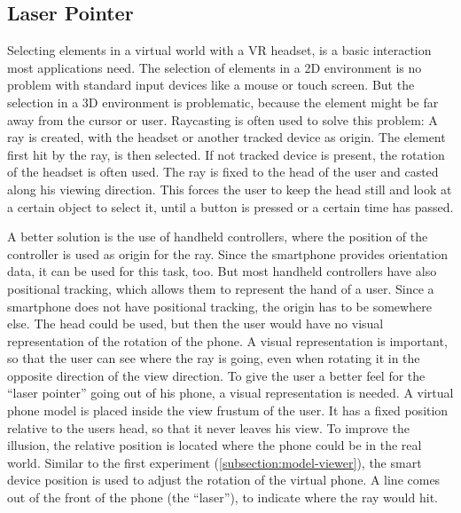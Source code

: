 \subsection{Laser Pointer}\label{subsection:laser-pointer}

Selecting elements in a virtual world with a \ac{VR} headset, is a basic interaction most applications need. The selection of elements in a \ac{2D} environment is no problem with standard input devices like a mouse or touch screen. But the selection in a \ac{3D} environment is problematic, because the element might be far away from the cursor or user. Raycasting is often used to solve this problem: A ray is created, with the headset or another tracked device as origin. The element first hit by the ray, is then selected. If not tracked device is present, the rotation of the headset is often used. The ray is fixed to the head of the user and casted along his viewing direction. %
This forces the user to keep the head still and look at a certain object to select it, until a button is pressed or a certain time has passed.


A better solution is the use of handheld controllers, where the position of the controller is used as origin for the ray. Since the smartphone provides orientation data, it can be used for this task, too. But most handheld controllers have also positional tracking, which allows them to represent the hand of a user. Since a smartphone does not have positional tracking, the origin has to be somewhere else. The head could be used, but then the user would have no visual representation of the rotation of the phone. A visual representation is important, so that the user can see where the ray is going, even when rotating it in the opposite direction of the view direction. To give the user a better feel for the \enquote{laser pointer} going out of his phone, a visual representation is needed. A virtual phone model is placed inside the view frustum of the user. It has a fixed position relative to the users head, so that it never leaves his view. To improve the illusion, the relative position is located where the phone could be in the real world. Similar to the first experiment (\ref{subsection:model-viewer}), the smart device position is used to adjust the rotation of the virtual phone. A line comes out of the front of the phone (the \enquote{laser}), to indicate where the ray would hit.